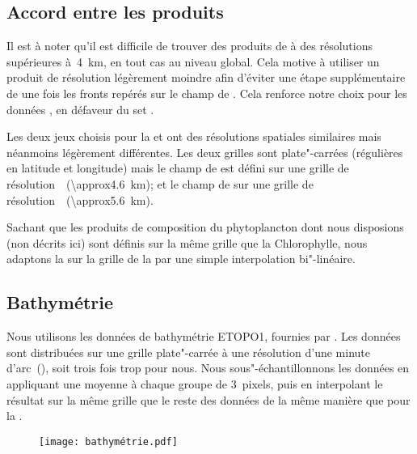 \subsection{Accord entre les produits}

Il est à noter qu'il est difficile de trouver des produits de  à des résolutions supérieures à~\qty{4}{\km}, en tout cas au niveau global.
Cela motive à utiliser un produit  de résolution légèrement moindre afin d'éviter une étape supplémentaire de  une fois les fronts repérés sur le champ de .
Cela renforce notre choix pour les données , en défaveur du set .

Les deux jeux choisis pour la  et  ont des résolutions spatiales similaires mais néanmoins légèrement différentes.
Les deux grilles sont plate"-carrées (régulières en latitude et longitude) mais le champ de  est défini sur une grille  de résolution~~(\qty{\approx4.6}{\km}); et le champ de  sur une grille  de résolution~~(\qty{\approx5.6}{\km}).

Sachant que les produits de composition du phytoplancton dont nous disposions (non décrits ici) sont définis sur la même grille que la Chlorophylle, nous adaptons la  sur la grille de la  par une simple interpolation bi"-linéaire.

\subsection{Bathymétrie}
\label{sec:donnees-bathymetrie}

Nous utilisons les données de bathymétrie ETOPO1, fournies par .
Les données sont distribuées sur une grille plate"-carrée à une résolution d'une minute d'arc~(), soit trois fois trop pour nous.
Nous sous"-échantillonnons les données en appliquant une moyenne à chaque groupe de 3~pixels, puis en interpolant le résultat sur la même grille que le reste des données de la même manière que pour la .

\begin{figure}
  \centering
  \texttt{[image: bathymétrie.pdf]}
  \label{fig:bathymetrie}
\end{figure}

